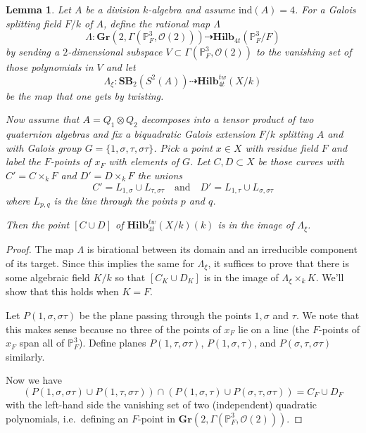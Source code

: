 \documentclass[12pt]{amsart}
\newtheorem{lem}[thm]{Lemma}
\theoremstyle{definition}
\newcommand{\SB}{\mathbf{SB}}
\newcommand{\Hilb}{\mathbf{Hilb}}
\begin{document}
\begin{lem}\label{lem: degen}
Let $A$ be a division $k$-algebra and assume $\mathrm{ind}(A)=4$. For a Galois splitting field $F/k$ of $A$, define the rational map $\Lambda$ \[\Lambda:\mathbf{Gr}(2,\Gamma(\mathbb{P}^3_F,\mathcal{O}(2))) \dashrightarrow \Hilb_{4t}(\mathbb{P}^3_F/F)\] by sending a $2$-dimensional subspace $V\subset \Gamma(\mathbb{P}^3_F,\mathcal{O}(2))$ to the vanishing set of those polynomials in $V$ and let \[\Lambda_\xi:\SB_2(S^2(A))\dashrightarrow \Hilb_{4t}^{tw}(X/k)\] be the map that one gets by twisting.

Now assume that $A=Q_1\otimes Q_2$ decomposes into a tensor product of two quaternion algebras and fix a biquadratic Galois extension $F/k$ splitting $A$ and with Galois group $G=\{1,\sigma,\tau,\sigma\tau\}$. Pick a point $x\in X$ with residue field $F$ and label the $F$-points of $x_F$ with elements of $G$. Let $C,D\subset X$ be those curves with $C'=C\times_k F$ and $D'=D\times_k F$ the unions \[C'=L_{1,\sigma}\cup L_{\tau,\sigma\tau} \quad \mbox{and}\quad D'=L_{1,\tau}\cup L_{\sigma,\sigma\tau}\] where $L_{p,q}$ is the line through the points $p$ and $q$.

Then the point $[C\cup D]$ of $\Hilb_{4t}^{tw}(X/k)(k)$ is in the image of $\Lambda_\xi$.
\end{lem}

\begin{proof}
The map $\Lambda$ is birational between its domain and an irreducible component of its target. Since this implies the same for $\Lambda_\xi$, it suffices to prove that there is some algebraic field $K/k$ so that $[C_K\cup D_K]$ is in the image of $\Lambda_{\xi}\times_k K$. We'll show that this holds when $K=F$.

Let $P(1,\sigma,\sigma\tau)$ be the plane passing through the points $1,\sigma$ and $\tau$. We note that this makes sense because no three of the points of $x_F$ lie on a line (the $F$-points of $x_F$ span all of $\mathbb{P}^3_F$). Define planes $P(1,\tau,\sigma\tau)$, $P(1,\sigma,\tau)$, and $P(\sigma,\tau,\sigma\tau)$ similarly.

Now we have \[\left(P(1,\sigma,\sigma\tau)\cup P(1,\tau,\sigma\tau)\right) \cap \left(P(1,\sigma,\tau)\cup P(\sigma,\tau,\sigma\tau)\right)=C_F\cup D_F\]
with the left-hand side the vanishing set of two (independent) quadratic polynomials, i.e.\ defining an $F$-point in $\mathbf{Gr}(2,\Gamma({\mathbb{P}^3_F,\mathcal{O}(2)}))$.
\end{proof}
\end{document}
